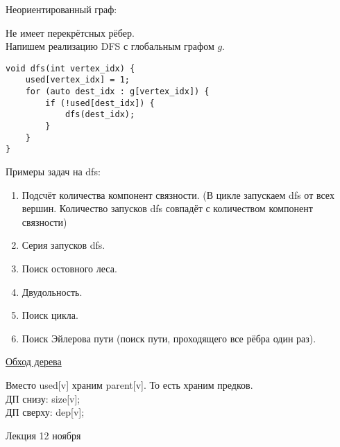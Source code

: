\documentclass[12pt, a4paper]{article}
\begin{document}
    \begin{center}
        Неориентированный граф:\\
    \end{center}
    Не имеет перекрётсных рёбер.\\
    Напишем реализацию DFS с глобальным графом $g$.
    \begin{lstlisting}
void dfs(int vertex_idx) {
    used[vertex_idx] = 1;
    for (auto dest_idx : g[vertex_idx]) {
        if (!used[dest_idx]) {
            dfs(dest_idx);
        }
    }
}
    \end{lstlisting}
    \begin{center}
        Примеры задач на dfs:
    \end{center}
    \begin{enumerate}
        \item Подсчёт количества компонент связности. (В цикле запускаем dfs от всех вершин. Количество запусков dfs совпадёт с количеством компонент связности)
        \item Серия запусков dfs.
        \item Поиск остовного леса.
        \item Двудольность.
        \item Поиск цикла.
        \item Поиск Эйлерова пути (поиск пути, проходящего все рёбра один раз).
    \end{enumerate}
    \begin{center}
        \underline{Обход дерева}
    \end{center}
    Вместо used[v] храним parent[v]. То есть храним предков.\\
    ДП снизу: size[v];\\
    ДП сверху: dep[v];
    \begin{center}
        Лекция 12 ноября
    \end{center}
\end{document}
